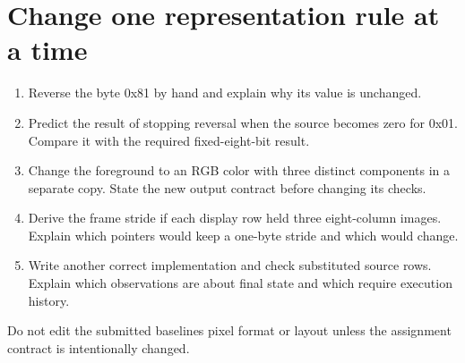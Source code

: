 \section{Change one representation rule at a
  time}\label{003-eight-byte-sprite-x-practice-change-one-representation-rule-at-a-time}

\begin{enumerate}
  \def\labelenumi{\arabic{enumi}.}
  \tightlist
  \item
        Reverse the byte 0x81 by hand and explain why its value is unchanged.
  \item
        Predict the result of stopping reversal when the source becomes zero
        for 0x01. Compare it with the required fixed-eight-bit result.
  \item
        Change the foreground to an RGB color with three distinct components
        in a separate copy. State the new output contract before changing its
        checks.
  \item
        Derive the frame stride if each display row held three eight-column
        images. Explain which pointers would keep a one-byte stride and which
        would change.
  \item
        Write another correct implementation and check substituted source
        rows. Explain which observations are about final state and which
        require execution history.
\end{enumerate}

Do not edit the submitted baseline\textquotesingle s pixel format or
layout unless the assignment contract is intentionally changed.
